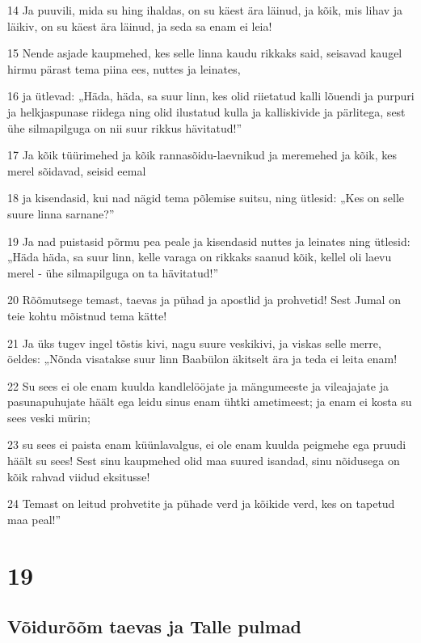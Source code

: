 \par 14 Ja puuvili, mida su hing ihaldas, on su käest ära läinud, ja kõik, mis lihav ja läikiv, on su käest ära läinud, ja seda sa enam ei leia!
\par 15 Nende asjade kaupmehed, kes selle linna kaudu rikkaks said, seisavad kaugel hirmu pärast tema piina ees, nuttes ja leinates,
\par 16 ja ütlevad: „Häda, häda, sa suur linn, kes olid riietatud kalli lõuendi ja purpuri ja helkjaspunase riidega ning olid ilustatud kulla ja kalliskivide ja pärlitega, sest ühe silmapilguga on nii suur rikkus hävitatud!”
\par 17 Ja kõik tüürimehed ja kõik rannasõidu-laevnikud ja meremehed ja kõik, kes merel sõidavad, seisid eemal
\par 18 ja kisendasid, kui nad nägid tema põlemise suitsu, ning ütlesid: „Kes on selle suure linna sarnane?”
\par 19 Ja nad puistasid põrmu pea peale ja kisendasid nuttes ja leinates ning ütlesid: „Häda häda, sa suur linn, kelle varaga on rikkaks saanud kõik, kellel oli laevu merel - ühe silmapilguga on ta hävitatud!”
\par 20 Rõõmutsege temast, taevas ja pühad ja apostlid ja prohvetid! Sest Jumal on teie kohtu mõistnud tema kätte!
\par 21 Ja üks tugev ingel tõstis kivi, nagu suure veskikivi, ja viskas selle merre, öeldes: „Nõnda visatakse suur linn Baabülon äkitselt ära ja teda ei leita enam!
\par 22 Su sees ei ole enam kuulda kandlelööjate ja mängumeeste ja vileajajate ja pasunapuhujate häält ega leidu sinus enam ühtki ametimeest; ja enam ei kosta su sees veski mürin;
\par 23 su sees ei paista enam küünlavalgus, ei ole enam kuulda peigmehe ega pruudi häält su sees! Sest sinu kaupmehed olid maa suured isandad, sinu nõidusega on kõik rahvad viidud eksitusse!
\par 24 Temast on leitud prohvetite ja pühade verd ja kõikide verd, kes on tapetud maa peal!”


\chapter{19}

\section*{Võidurõõm taevas ja Talle pulmad}

